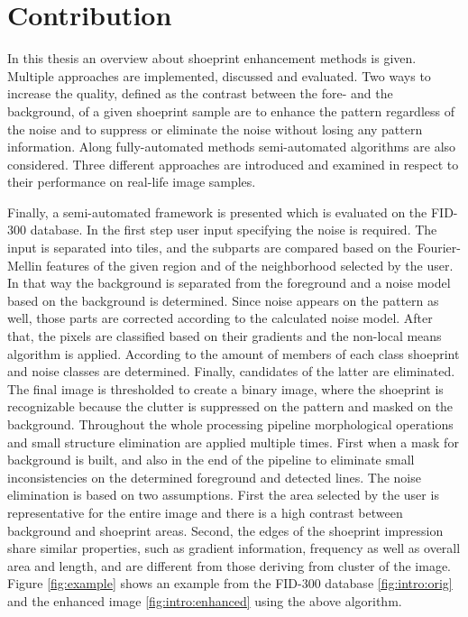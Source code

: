 \documentclass[draft,final]{vutinfth} %
\begin{document}
\section{Contribution}
\par
In this thesis an overview about shoeprint enhancement methods is given.
Multiple approaches are implemented, discussed and evaluated.
Two ways to increase the quality, defined as the contrast between the fore- and the background, of a given shoeprint sample are to enhance the pattern regardless of the noise and to suppress or eliminate the noise without losing any pattern information.
Along fully-automated methods semi-automated algorithms are also considered.
Three different approaches are introduced and examined in respect to their performance on real-life image samples.
\par
Finally, a semi-automated framework is presented which is evaluated on the FID-300 database.
In the first step user input specifying the noise is required.
The input is separated into tiles, and the subparts are compared based on the Fourier-Mellin features of the given region and of the neighborhood selected by the user.
In that way the background is separated from the foreground and a noise model based on the background is determined.
Since noise appears on the pattern as well, those parts are corrected according to the calculated noise model.
After that, the pixels are classified based on their gradients and the non-local means algorithm is applied.
According to the amount of members of each class shoeprint and noise classes are determined.
Finally, candidates of the latter are eliminated.
The final image is thresholded to create a binary image, where the shoeprint is recognizable because the clutter is suppressed on the pattern and masked on the background.
Throughout the whole processing pipeline morphological operations and small structure elimination are applied multiple times. 
First when a mask for background is built, and also in the end of the pipeline to eliminate small inconsistencies on the determined foreground and detected lines. 
The noise elimination is based on two assumptions.
First the area selected by the user is representative for the entire image and there is a high contrast between background and shoeprint areas.
Second, the edges of the shoeprint impression share similar properties, such as gradient information, frequency as well as overall area and length, and are different from those deriving from cluster of the image.
Figure \ref{fig:example} shows an example from the FID-300 database \ref{fig:intro:orig} and the enhanced image \ref{fig:intro:enhanced} using the above algorithm.
\end{document}

